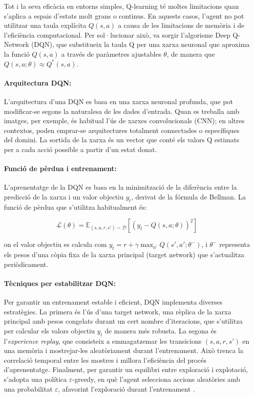 \documentclass[12pt,a4paper,twoside]{book}
\begin{document}
Tot i la seva eficàcia en entorns simples, Q-learning té moltes limitacions quan s’aplica a espais d’estats molt grans o continus. En aquests casos, l'agent no pot utilitzar una taula explícita $Q(s,a)$ a causa de les limitacions de memòria i de l'eficiència computacional. Per sol·lucionar això, va sorgir l’algorisme Deep Q-Network (DQN), que substitueix la taula Q per una xarxa neuronal que aproxima la funció $Q(s,a)$ a través de paràmetres ajustables $\theta$, de manera que $Q(s,a; \theta) \approx Q^*(s,a)$.


\paragraph{Arquitectura DQN:}

L’arquitectura d’una DQN es basa en una xarxa neuronal profunda, que pot modificar-se segons la naturalesa de les dades d’entrada. Quan es treballa amb imatges, per exemple, és habitual l’ús de xarxes convolucionals (CNN); en altres contextos, poden emprar-se arquitectures totalment connectades o específiques del domini. La sortida de la xarxa és un vector que conté els valors Q estimats per a cada acció possible a partir d’un estat donat.


\paragraph{Funció de pèrdua i entrenament:}

L’aprenentatge de la DQN es basa en la minimització de la diferència entre la predicció de la xarxa i un valor objectiu $y_t$, derivat de la fórmula de Bellman. La funció de pèrdua que s’utilitza habitualment és:

\begin{equation}
\mathcal{L}(\theta) = \mathbb{E}_{(s,a,r,s') \sim \mathcal{D}} \left[ \left( y_t - Q(s, a; \theta) \right)^2 \right]
\end{equation}

on el valor objectiu es calcula com $y_t = r + \gamma \max_{a'} Q(s', a'; \theta^-)$, i $\theta^-$ representa els pesos d’una còpia fixa de la xarxa principal (target network) que s’actualitza periòdicament.


\paragraph{Tècniques per estabilitzar DQN:}
Per garantir un entrenament estable i eficient, DQN implementa diverses estratègies. La primera és l’ús d’una target network, una rèplica de la xarxa principal amb pesos congelats durant un cert nombre d’iteracions, que s'utilitza per calcular els valors objectiu $y_t$ de manera més robusta. La segona és l’\textit{experience replay}, que consisteix a emmagatzemar les transicions $(s,a,r,s')$ en una memòria i mostrejar-les aleatòriament durant l’entrenament. Això trenca la correlació temporal entre les mostres i millora l’eficiència del procés d’aprenentatge. Finalment, per garantir un equilibri entre exploració i explotació, s’adopta una política $\varepsilon$-greedy, en què l’agent selecciona accions aleatòries amb una probabilitat $\varepsilon$, afavorint l'exploració durant l'entrenament \cite{M9}\cite{MnihNature2015}.
\end{document}
